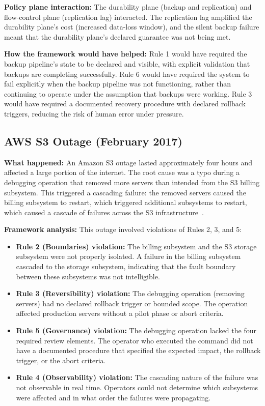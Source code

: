 \documentclass[conference]{IEEEtran}
\begin{document}
\textbf{Policy plane interaction:} The durability plane (backup and replication) and flow-control plane (replication lag) interacted. The replication lag amplified the durability plane's cost (increased data-loss window), and the silent backup failure meant that the durability plane's declared guarantee was not being met.

\textbf{How the framework would have helped:} Rule 1 would have required the backup pipeline's state to be declared and visible, with explicit validation that backups are completing successfully. Rule 6 would have required the system to fail explicitly when the backup pipeline was not functioning, rather than continuing to operate under the assumption that backups were working. Rule 3 would have required a documented recovery procedure with declared rollback triggers, reducing the risk of human error under pressure.

\subsection{AWS S3 Outage (February 2017)}

\textbf{What happened:} An Amazon S3 outage lasted approximately four hours and affected a large portion of the internet. The root cause was a typo during a debugging operation that removed more servers than intended from the S3 billing subsystem. This triggered a cascading failure: the removed servers caused the billing subsystem to restart, which triggered additional subsystems to restart, which caused a cascade of failures across the S3 infrastructure~\cite{aws2017}.

\textbf{Framework analysis:} This outage involved violations of Rules 2, 3, and 5:

\begin{itemize}
    \item \textbf{Rule 2 (Boundaries) violation:} The billing subsystem and the S3 storage subsystem were not properly isolated. A failure in the billing subsystem cascaded to the storage subsystem, indicating that the fault boundary between these subsystems was not intelligible.
    
    \item \textbf{Rule 3 (Reversibility) violation:} The debugging operation (removing servers) had no declared rollback trigger or bounded scope. The operation affected production servers without a pilot phase or abort criteria.
    
    \item \textbf{Rule 5 (Governance) violation:} The debugging operation lacked the four required review elements. The operator who executed the command did not have a documented procedure that specified the expected impact, the rollback trigger, or the abort criteria.
    
    \item \textbf{Rule 4 (Observability) violation:} The cascading nature of the failure was not observable in real time. Operators could not determine which subsystems were affected and in what order the failures were propagating.
\end{itemize}
\end{document}
